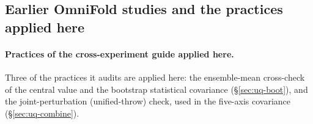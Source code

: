 \subsection{Earlier OmniFold studies and the practices applied here}\label{recsec:intro-omnifold}


\paragraph{Practices of the cross-experiment guide applied here.} Three of the practices it audits are applied here: the ensemble-mean cross-check of the central value and the bootstrap statistical covariance (\S\ref{sec:uq-boot}), and the joint-perturbation (unified-throw) check, used in the five-axis covariance (\S\ref{sec:uq-combine}).

